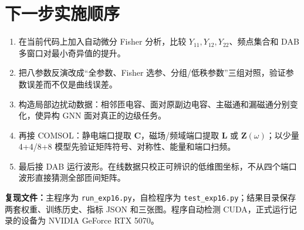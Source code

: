 \documentclass[10pt,a4paper]{ctexart}
\begin{document}
\section{下一步实施顺序}
\begin{enumerate}
 \item 在当前代码上加入自动微分 Fisher 分析，比较 $Y_{11},Y_{12},Y_{22}$、频点集合和 DAB 多窗口对最小奇异值的提升。
 \item 把八参数反演改成“全参数、Fisher 选参、分组/低秩参数”三组对照，验证参数误差而不仅是曲线误差。
 \item 构造局部边扰动数据：相邻匝电容、面对原副边电容、主磁通和漏磁通分别变化，使异构 GNN 面对真正的边级任务。
 \item 再接 COMSOL：静电端口提取 $\bm C$，磁场/频域端口提取 $\bm L$ 或 $\bm Z(\omega)$；以少量 4+4/8+8 模型先验证矩阵符号、对称性、能量和端口扫频。
 \item 最后接 DAB 运行波形。在线数据只校正可辨识的低维图坐标，不从四个端口波形直接猜测全部匝间矩阵。
\end{enumerate}

\smallskip\noindent\textbf{复现文件：}主程序为 \texttt{run\_exp16.py}，自检程序为 \texttt{test\_exp16.py}；结果目录保存两套权重、训练历史、指标 JSON 和三张图。程序自动检测 CUDA，正式运行记录的设备为 NVIDIA GeForce RTX 5070。
\end{document}
